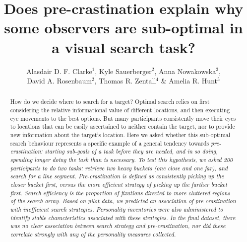 \documentclass[]{rsos}
\begin{document}
\title{Does pre-crastination explain why some observers are sub-optimal in a visual search task?}

\author{Alasdair D. F. Clarke$^{1}$, Kyle Sauerberger$^{2}$, Anna Nowakowska$^{3}$,\\ David A. Rosenbaum$^{2}$, Thomas R. Zentall$^{4}$ \& Amelia R. Hunt$^{5}$}

\address{$^{1}$Dept. of Psychology, University of Essex, UK\\
$^{2}$Dept. of Psychology, University of California, USA\\
$^{3}$School of Psychology and Vision Sciences, University of Leicester, UK\\
$^{4}$Dept. of Psychology, University of Kentucky, USA\\
$^{5}$School of Psychology, University of Aberdeen, UK}
\subject{Psychology}




\begin{abstract}
How do we decide where to search for a target? Optimal search relies on first considering the relative informational value of different locations, and then executing eye movements to the best options. But many participants consistently move their eyes to locations that can be easily ascertained to neither contain the target, nor to provide new information about the target's location. Here we asked whether this sub-optimal search behaviour represents a specific example of a general tendency towards \textit{pre-crastination: starting sub-goals of a task before they are needed, and in so doing, spending longer doing the task than is necessary. To test this hypothesis, we asked 200 participants to do two tasks: retrieve two heavy buckets (one close and one far), and search for a line segment. Pre-crastination is defined as consistently picking up the closer bucket first, versus the more efficient strategy of picking up the farther bucket first. Search efficiency is the proportion of fixations directed to more cluttered regions of the search array. Based on pilot data, we predicted an association of pre-crastination with inefficient search strategies. Personality inventories were also administered to identify stable characteristics associated with these strategies. In the final dataset, there was no clear association between search strategy and pre-crastination, nor did these correlate strongly with any of the personality measures collected.}
\end{abstract}
\end{document}
